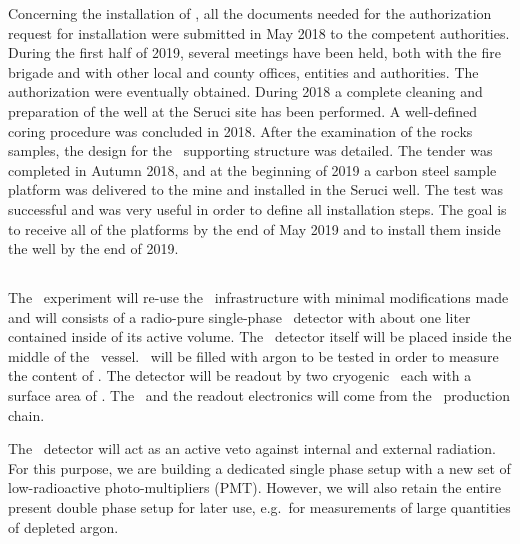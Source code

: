 Concerning the installation of \SeruciOne, all the documents needed for the authorization request for installation were submitted in May 2018 to the competent authorities. During the first half of 2019, several meetings have been held, both with the fire brigade and with other local and county offices, entities and authorities. The authorization were eventually obtained.  During  2018 a complete cleaning and preparation of the well at the Seruci site has been performed.  A well-defined coring procedure was concluded in 2018. After the examination of the rocks samples, the design for the \SeruciOne\ supporting structure was detailed. The tender was completed in Autumn 2018, and at the beginning of 2019 a carbon steel sample platform was delivered to the mine  and installed in the Seruci well.  The test was successful and was very useful in order to define all  installation steps. 
The goal is to receive all of the platforms by the end of May 2019 and to install them inside the  well by the end of 2019.


\subsection{\DArT} 
The \DArT\ experiment will re-use the \ArDM\ infrastructure with minimal modifications made and will consists of a radio-pure single-phase \LAr\ detector with about one liter contained inside of its active volume.  The \DArT\ detector itself will be placed inside the middle of the \ArDM\ vessel.  \DArT\ will be filled with argon to be tested in order to measure the content of .  The detector will be readout by two cryogenic \SiPMs\ each with a surface area of \DSkSiPMAreaMaxcm.  The \SiPMs\ and the readout electronics will come from the \DSks\ production chain. 

The \ArDM\ detector will act as an active veto against internal and external radiation. For this purpose, we are building a dedicated single phase setup with a new set of low-radioactive photo-multipliers (PMT). However, we will also retain the entire present double phase setup for later use, e.g.~for measurements of large quantities of depleted argon.

